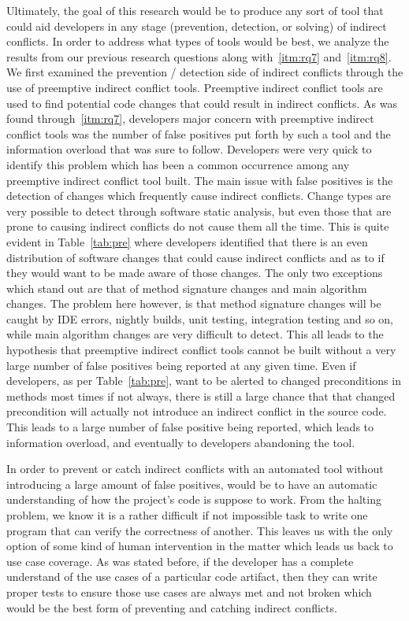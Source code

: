 \documentclass[conference]{IEEEtran}
\begin{document}
Ultimately, the goal of this research would be to produce any sort of tool that could aid developers in any stage (prevention, detection, or
solving) of indirect conflicts. In order to address what types of tools would be best, we analyze the results from our previous research
questions along with~\ref{itm:rq7} and~\ref{itm:rq8}. We first examined the prevention / detection side of indirect conflicts through the use of
preemptive indirect conflict tools. Preemptive indirect conflict tools are used to find potential code changes that could result in indirect
conflicts. As was found through~\ref{itm:rq7}, developers major concern with preemptive indirect conflict tools was the number of false positives put
forth by such a tool and the information overload that was sure to follow. Developers were very quick to identify this problem which has
been a common occurrence among any preemptive indirect conflict tool built. The main issue with false positives is the detection of changes
which frequently cause indirect conflicts. Change types are very possible to detect through software static analysis, but even those that are
prone to causing indirect conflicts do not cause them all the time. This is quite evident in Table~\ref{tab:pre} where developers identified
that there is an even distribution of software changes that could cause indirect conflicts and as to if they would want to be made aware of
those changes. The only two exceptions which stand out are that of method signature changes and main algorithm changes. The problem here however,
is that method signature changes will be caught by IDE errors, nightly builds, unit testing, integration testing and so on, while main algorithm
changes are very difficult to detect. This all leads to the hypothesis that preemptive indirect conflict tools cannot be built without a very
large number of false positives being reported at any given time. Even if developers, as per Table~\ref{tab:pre}, want to be alerted to 
changed preconditions in methods most times if not always, there is still a large chance that that changed precondition will actually not
introduce an indirect conflict in the source code. This leads to a large number of false positive being reported, which leads to information
overload, and eventually to developers abandoning the tool.

In order to prevent or catch indirect conflicts with an automated tool without introducing a large amount of false positives, would be to
have an automatic understanding of how the project's code is suppose to work. From the halting problem, we know it is a rather difficult
if not impossible task to write one program that can verify the correctness of another. This leaves us with the only option of some kind of
human intervention in the matter which leads us back to use case coverage. As was stated before, if the developer has a complete understand
of the use cases of a particular code artifact, then they can write proper tests to ensure those use cases are always met and not broken which
would be the best form of preventing and catching indirect conflicts.
\end{document}

